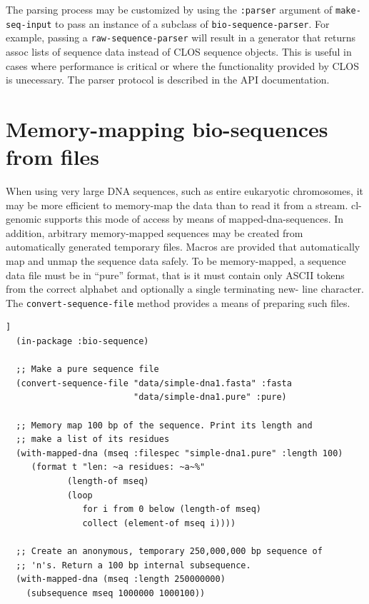 \documentclass[a4paper, 12pt]{article}
\begin{document}
The parsing process may be customized by using the \lstinline!:parser!
argument of \lstinline!make-seq-input! to pass an instance of a
subclass of \lstinline!bio-sequence-parser!. For example, passing a
\lstinline!raw-sequence-parser!  will result in a generator that
returns assoc lists of sequence data instead of CLOS sequence objects.
This is useful in cases where performance is critical or where the
functionality provided by CLOS is unecessary. The parser protocol is
described in the API documentation.


\section{Memory-mapping bio-sequences from files}
\label{sec:memory-map-bioseq}

When using very large DNA sequences, such as entire eukaryotic
chromosomes, it may be more efficient to memory-map the data than to
read it from a stream. cl-genomic supports this mode of access by
means of mapped-dna-sequences. In addition, arbitrary memory-mapped
sequences may be created from automatically generated temporary
files. Macros are provided that automatically map and unmap the
sequence data safely. To be memory-mapped, a sequence data file must
be in ``pure'' format, that is it must contain only ASCII tokens from
the correct alphabet and optionally a single terminating new- line
character. The \lstinline!convert-sequence-file! method provides a
means of preparing such files.



\begin{lstlisting}[caption={Memory-mapping a bio-sequence},
  label=lst:memory-map-bioseq,float=[tbph]]
  (in-package :bio-sequence)

  ;; Make a pure sequence file
  (convert-sequence-file "data/simple-dna1.fasta" :fasta
                         "data/simple-dna1.pure" :pure)

  ;; Memory map 100 bp of the sequence. Print its length and
  ;; make a list of its residues
  (with-mapped-dna (mseq :filespec "simple-dna1.pure" :length 100)
     (format t "len: ~a residues: ~a~%"
            (length-of mseq)
            (loop
               for i from 0 below (length-of mseq)
               collect (element-of mseq i))))

  ;; Create an anonymous, temporary 250,000,000 bp sequence of
  ;; 'n's. Return a 100 bp internal subsequence.
  (with-mapped-dna (mseq :length 250000000)
    (subsequence mseq 1000000 1000100))
\end{lstlisting}
\end{document}

